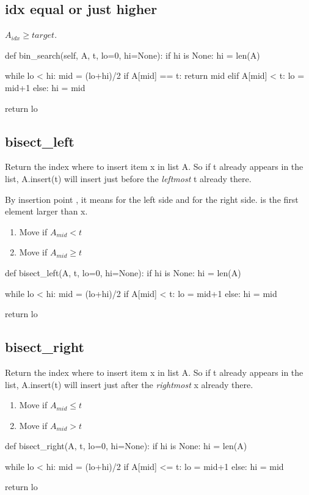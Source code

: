 \subsection{idx equal or just higher}
$A_{idx} \geq target$.
\begin{python}
def bin_search(self, A, t, lo=0, hi=None):
    if hi is None: hi = len(A)
   
    while lo < hi:
        mid = (lo+hi)/2
        if A[mid] == t:  return mid
        elif A[mid] < t: lo = mid+1
        else:            hi = mid
        
    return lo
\end{python}
\subsection{bisect\_left}
Return the index where to insert item x in list A. So if t already appears in the list,
A.insert(t) will insert just before the \textit{leftmost} t already there.

By insertion point , it means  for the left side and  for the right side.  is the first element larger than x. 
\begin{enumerate}
\item Move  if $A_{mid} < t$
\item Move  if $A_{mid} \geq t$
\end{enumerate}

\begin{python}
def bisect_left(A, t, lo=0, hi=None):
    if hi is None: hi = len(A)

    while lo < hi:
        mid = (lo+hi)/2
        if A[mid] < t: lo = mid+1   
        else:          hi = mid

    return lo
\end{python}

\subsection{bisect\_right}
Return the index where to insert item x in list A. So if t already appears in the list, A.insert(t) will insert just after the \textit{rightmost} x already there.
\begin{enumerate}
\item Move  if $A_{mid} \leq t$
\item Move  if $A_{mid} > t$
\end{enumerate}
\begin{python}
def bisect_right(A, t, lo=0, hi=None):
    if hi is None: hi = len(A)

    while lo < hi:
        mid = (lo+hi)/2
        if A[mid] <= t: lo = mid+1
        else:           hi = mid 

    return lo
\end{python}

